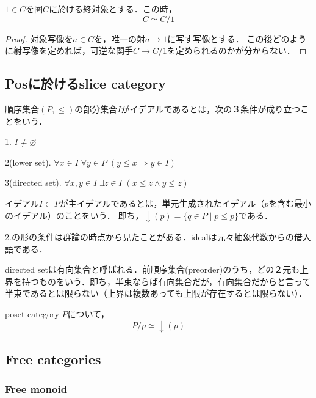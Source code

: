 \documentclass[uplatex, 12pt, dvipdfmx]{jsarticle}
\begin{document}
\begin{proposition*}
    $1\in C$を圏$C$に於ける終対象とする．この時，
    \[ C\simeq C/1 \]
\end{proposition*}
\begin{proof}
    対象写像を$a\in C$を，唯一の射$a\to 1$に写す写像とする．
    この後どのように射写像を定めれば，可逆な関手$C\to C/1$を定められるのかが分からない．
\end{proof}

\subsection*{Posに於けるslice category}

\begin{definition*}
    順序集合$(P,\le)$の部分集合$I$がイデアルであるとは，次の３条件が成り立つことをいう．

    1. $I\ne\varnothing$

    2(lower set). $\forall x\in I\; \forall y\in P\; (y\le x\Rightarrow y\in I)$

    3(directed set). $\forall x,y\in I\; \exists z\in I\; (x\le z\land y\le z)$

    イデアル$I\subset P$が主イデアルであるとは，単元生成されたイデアル（$p$を含む最小のイデアル）のことをいう．
    即ち，$\downarrow(p)=\{q\in P\mid p\le p\}$である．
\end{definition*}
\begin{remark*}
    2.の形の条件は群論の時点から見たことがある．idealは元々抽象代数からの借入語である．

    directed setは有向集合と呼ばれる．前順序集合(preorder)のうち，どの２元も\underline{上界}を持つものをいう．即ち，半束ならば有向集合だが，有向集合だからと言って半束であるとは限らない（上界は複数あっても上限が存在するとは限らない）．
\end{remark*}

\begin{proposition*}
    poset category $P$について，
    \[ P/p \simeq \downarrow (p) \]
\end{proposition*}

\subsection{Free categories}

\subsubsection{Free monoid}
\end{document}
